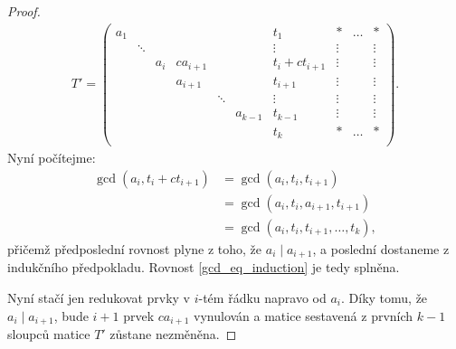 \begin{proof}
\begin{align*}
T' =
    \left(
    \begin{array}{ccccccc|ccc}
        a_1 &        &     &          &        &         & t_1              & \ast   & \hdots & \ast   \\
            & \ddots &     &          &        &         & \vdots           & \vdots &        & \vdots \\
            &        & a_i & ca_{i+1} &        &         & t_{i} + ct_{i+1} & \vdots &        & \vdots \\
            &        &     & a_{i+1}  &        &         & t_{i+1}          & \vdots &        & \vdots \\
            &        &     &          & \ddots &         & \vdots           & \vdots &        & \vdots \\
            &        &     &          &        & a_{k-1} & t_{k-1}          & \vdots &        & \vdots \\
            &        &     &          &        &         & t_k              & \ast   & \hdots & \ast   \\
    \end{array}
    \right)
.
\end{align*}
Nyní počítejme:
\begin{align*}
    \gcd(a_i, t_{i} + ct_{i+1}) &= \gcd(a_i, t_{i}, t_{i+1}) \\
                                &= \gcd(a_i, t_{i}, a_{i+1}, t_{i+1}) \\
                                &= \gcd(a_i, t_{i}, t_{i+1},\dots,t_{k}),
\end{align*}
přičemž předposlední rovnost plyne z toho, že $ a_i \mid a_{i+1} $, a
poslední dostaneme z indukčního předpokladu. Rovnost \ref{gcd_eq_induction} je
tedy splněna.

Nyní stačí jen redukovat prvky v $ i $-tém řádku napravo od $ a_i $. Díky tomu,
že $ a_i \mid a_{i+1} $, bude $ i + 1 $ prvek $ ca_{i+1} $ vynulován a
matice sestavená z prvních $ k - 1 $ sloupců matice $ T' $ zůstane nezměněna.
\end{proof}

